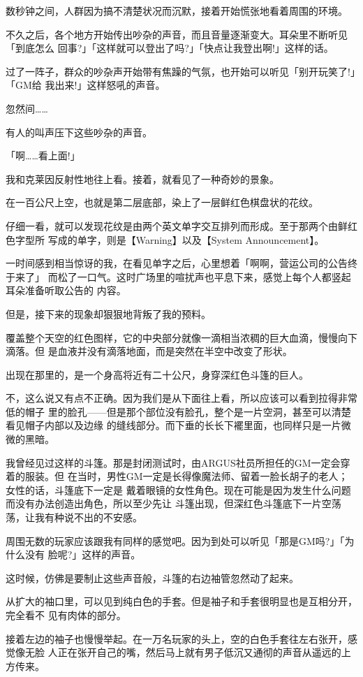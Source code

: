 \documentclass[11pt]{book}
\begin{document}
数秒钟之间，人群因为搞不清楚状况而沉默，接着开始慌张地看着周围的环境。

不久之后，各个地方开始传出吵杂的声音，而且音量逐渐变大。耳朵里不断听见「到底怎么
回事?」「这样就可以登出了吗?」「快点让我登出啊!」这样的话。

过了一阵子，群众的吵杂声开始带有焦躁的气氛，也开始可以听见「别开玩笑了!」「GM给
我出来!」这样怒吼的声音。

忽然间……

有人的叫声压下这些吵杂的声音。

「啊……看上面!」

我和克莱因反射性地往上看。接着，就看见了一种奇妙的景象。

在一百公尺上空，也就是第二层底部，染上了一层鲜红色棋盘状的花纹。

仔细一看，就可以发现花纹是由两个英文单字交互排列而形成。至于那两个由鲜红色字型所
写成的单字，则是【Warning】以及【System Announcement】。

一时间感到相当惊讶的我，在看见单字之后，心里想着「啊啊，营运公司的公告终于来了」
而松了一口气。这时广场里的喧扰声也平息下来，感觉上每个人都竖起耳朵准备听取公告的
内容。

但是，接下来的现象却狠狠地背叛了我的预料。

覆盖整个天空的红色图样，它的中央部分就像一滴相当浓稠的巨大血滴，慢慢向下滴落。但
是血液并没有滴落地面，而是突然在半空中改变了形状。

出现在那里的，是一个身高将近有二十公尺，身穿深红色斗篷的巨人。

不，这么说又有点不正确。因为我们是从下面往上看，所以应该可以看到拉得非常低的帽子
里的脸孔——但是那个部位没有脸孔，整个是一片空洞，甚至可以清楚看见帽子内部以及边缘
的缝线部分。而下垂的长长下襬里面，也同样只是一片微微的黑暗。

我曾经见过这样的斗篷。那是封闭测试时，由ARGUS社员所担任的GM一定会穿着的服装。但
在当时，男性GM一定是长得像魔法师、留着一脸长胡子的老人；女性的话，斗篷底下一定是
戴着眼镜的女性角色。现在可能是因为发生什么问题而没有办法创造出角色，所以至少先让
斗篷出现，但深红色斗篷底下一片空荡荡，让我有种说不出的不安感。

周围无数的玩家应该跟我有同样的感觉吧。因为到处可以听见「那是GM吗?」「为什么没有
脸呢?」这样的声音。

这时候，仿佛是要制止这些声音般，斗篷的右边袖管忽然动了起来。

从扩大的袖口里，可以见到纯白色的手套。但是袖子和手套很明显也是互相分开，完全看不
见有肉体的部分。

接着左边的袖子也慢慢举起。在一万名玩家的头上，空的白色手套往左右张开，感觉像无脸
人正在张开自己的嘴，然后马上就有男子低沉又通彻的声音从遥远的上方传来。
\end{document}
